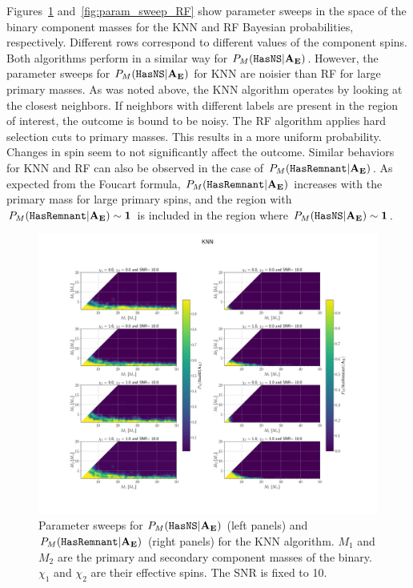 Figures~\ref{fig:param_sweep_KNN} and~\ref{fig:param_sweep_RF} show parameter sweeps in the space of the binary component masses for the \ac{KNN} and \ac{RF} Bayesian probabilities,
respectively. Different rows correspond to different values of the component spins. Both algorithms perform in a similar way for $P_M({{\tt HasNS}} |\bf{A_E})$. However, the parameter sweeps for
$P_M({{\tt HasNS}} |\bf{A_E})$ for \ac{KNN} are noisier than \ac{RF} for large primary masses. As was noted above, the \ac{KNN} algorithm operates by looking at the closest neighbors. If
neighbors with different labels are present in the region of interest, the outcome is bound to be noisy. The \ac{RF} algorithm applies hard selection cuts to primary masses. This results
in a more uniform probability. Changes in spin seem to not significantly affect the outcome.  Similar behaviors for \ac{KNN} and \ac{RF} can also be observed in the case of $P_M({{\tt HasRemnant}}
|\bf{A_E})$. As expected from the Foucart formula, $P_M({{\tt HasRemnant}} |\bf{A_E})$ increases with the primary mass for large primary spins, and the region with $P_M({{\tt HasRemnant}} |\bf{A_E}) \sim 1$ is
included in the region where $P_M({{\tt HasNS}} |\bf{A_E}) \sim 1$.

\begin{figure}%
\includegraphics[width=0.9\linewidth]{KNN_parameter_sweep}
    \caption{Parameter sweeps for $P_M({{\tt HasNS}} |\bf{A_E})$ (left panels) and $P_M({{\tt HasRemnant}} |\bf{A_E})$ (right panels) for the \ac{KNN} algorithm. $M_1$ and $M_2$ are the primary and secondary component masses of the binary. $\chi_1$ and $\chi_2$ are their effective spins. The \ac{SNR} is fixed to 10.}
\label{fig:param_sweep_KNN}
\end{figure}

